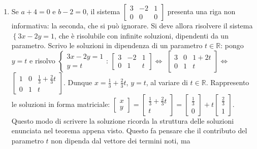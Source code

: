 \documentclass{article}
\begin{document}
\begin{enumerate}
\begin{enumerate}
\item Se $a+4=0$ e $b-2=0$, il sistema $\left[ 
\begin{array}{ccc}
3 & -2 & 1 \\ 
0 & 0 & 0%
\end{array}%
\right] $ presenta una riga non informativa: la seconda, che si pu\`{o}
ignorare. Si deve allora risolvere il sistema $\left\{ 3x-2y=1\right. $, che 
\`{e} risolubile con infinite soluzioni, dipendenti da un parametro. Scrivo
le soluzioni in dipendenza di un parametro $t\in 
\mathbb{R}
$: pongo $y=t$ e risolvo $\left\{ 
\begin{array}{c}
3x-2y=1 \\ 
y=t%
\end{array}%
\right. $: $\left[ 
\begin{array}{ccc}
3 & -2 & 1 \\ 
0 & 1 & t%
\end{array}%
\right] \Longleftrightarrow $ $\left[ 
\begin{array}{ccc}
3 & 0 & 1+2t \\ 
0 & 1 & t%
\end{array}%
\right] \Longleftrightarrow $ $\left[ 
\begin{array}{ccc}
1 & 0 & \frac{1}{3}+\frac{2}{3}t \\ 
0 & 1 & t%
\end{array}%
\right] $. Dunque $x=\frac{1}{3}+\frac{2}{3}t$, $y=t$, al variare di $t\in 
\mathbb{R}
$. Rappresento le soluzioni in forma matriciale: $\left[ 
\begin{array}{c}
x \\ 
y%
\end{array}%
\right] =\left[ 
\begin{array}{c}
\frac{1}{3}+\frac{2}{3}t \\ 
t%
\end{array}%
\right] =\left[ 
\begin{array}{c}
\frac{1}{3} \\ 
0%
\end{array}%
\right] +t\left[ 
\begin{array}{c}
\frac{2}{3} \\ 
1%
\end{array}%
\right] $. Questo modo di scrivere la soluzione ricorda la struttura delle
soluzioni enunciata nel teorema appena visto. Questo fa pensare che il
contributo del parametro $t$ non dipenda dal vettore dei termini noti, ma

\end{enumerate}
\end{enumerate}
\end{document}
